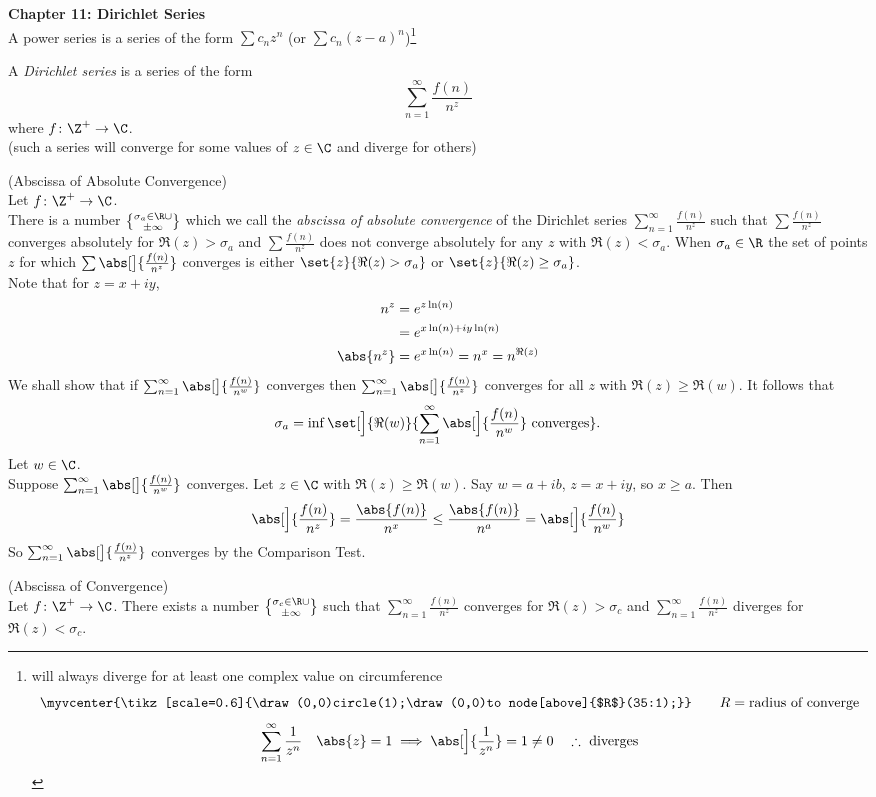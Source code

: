 \textbf{Chapter 11: Dirichlet Series} \\
A power series is a series of the form $\sum c_nz^n$ (or $\sum c_n(z-a)^n$)\footnote{will always diverge for at least one complex value on circumference
\[ \myvcenter{\tikz[scale=0.6]{\draw(0,0)circle(1);\draw(0,0)to node[above]{$R$}(35:1);}} \qquad R=\text{radius of converge} \]
\[ \sum_{n=1}^\infty\frac{1}{z^n}\quad\abs{z}=1\implies\abs[\Big]{\frac1{z^n}}=1\neq0\quad\therefore\text{ diverges}\]}

 A \emph{Dirichlet series} is a series of the form
\[ \sum_{n=1}^\infty \frac{f(n)}{n^z} \]
where $f\colon\Z^+\to\C$. \\
(such a series will converge for some values of $z\in\C$ and diverge for others)

\thm (Abscissa of Absolute Convergence) \\
Let $f\colon\Z^+\to\C$. \\
There is a number $\sigma_a\in\R\cup\brace{\pm\infty}$ which we call the \emph{abscissa of absolute convergence} of the Dirichlet series $\sum_{n=1}^\infty\frac{f(n)}{n^z}$ such that $\sum\frac{f(n)}{n^z}$ converges absolutely for $\Re(z)>\sigma_a$ and $\sum\frac{f(n)}{n^z}$ does not converge absolutely for any $z$ with $\Re(z)<\sigma_a$.  When $\sigma_a\in\R$ the set of points $z$ for which $\sum\abs[\big]{\frac{f(n)}{n^z}}$ converges is either $\set{z}{\Re(z)>\sigma_a}$ or $\set{z}{\Re(z)\geq\sigma_a}$. \\
\pf Note that for $z=x+iy$,
\begin{align*}
n^z &= e^{z\ln(n)} \\
&= e^{x\ln(n)+iy\ln(n)} \\
\abs{n^z} &= e^{x\ln(n)} = n^x = n^{\Re(z)}
\end{align*}
We shall show that if $\sum_{n=1}^\infty\abs[\big]{\frac{f(n)}{n^w}}$ converges then  $\sum_{n=1}^\infty\abs[\big]{\frac{f(n)}{n^z}}$ converges for all $z$ with $\Re(z)\geq\Re(w)$.
It follows that
\[ \sigma_a = \inf\set[\Big]{\Re(w)}{\sum_{n=1}^\infty\abs[\Big]{\frac{f(n)}{n^w}}\text{ converges}} . \]
Let $w\in\C$. \\
Suppose $\sum_{n=1}^\infty\abs[\big]{\frac{f(n)}{n^w}}$ converges.
Let $z\in\C$ with $\Re(z)\geq\Re(w)$.  Say $w=a+ib$, $z=x+iy$, so $x\geq a$.  Then
\[ \abs[\Big]{\frac{f(n)}{n^z}} = \frac{\abs{f(n)}}{n^x} \leq \frac{\abs{f(n)}}{n^a} = \abs[\Big]{\frac{f(n)}{n^w}} \]
So $\sum_{n=1}^\infty\abs[\big]{\frac{f(n)}{n^z}}$ converges by the Comparison Test.

\thm (Abscissa of Convergence) \\
Let $f\colon\Z^+\to\C$.
There exists a number $\sigma_c\in\R\cup\brace{\pm\infty}$ such that $\sum_{n=1}^\infty\frac{f(n)}{n^z}$ converges for $\Re(z)>\sigma_c$ and $\sum_{n=1}^\infty\frac{f(n)}{n^z}$ diverges for $\Re(z)<\sigma_c$.

